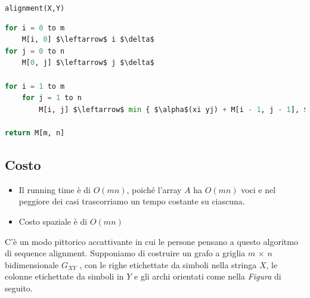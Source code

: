 \texttt{alignment(X,Y)}
\begin{lstlisting}[language=Python, mathescape=true]
for i = 0 to m
	M[i, 0] $\leftarrow$ i $\delta$
for j = 0 to n
	M[0, j] $\leftarrow$ j $\delta$
	
for i = 1 to m
	for j = 1 to n
		M[i, j] $\leftarrow$ min { $\alpha$(xi yj) + M[i - 1, j - 1], $\delta$ + M [i - 1, j], $\delta$ + M [i, j - 1] }
 		
return M[m, n]
\end{lstlisting}

\subsection{Costo}

\begin{itemize}
  \item
        Il running time è di $O(mn)$, poiché l'array $A$ ha $O(mn)$ voci
        e nel peggiore dei casi trascorriamo un tempo costante su ciascuna.
  \item
        Costo spaziale è di $O(mn)$
\end{itemize}

C'è un modo pittorico accattivante in cui le persone pensano a questo
algoritmo di sequence alignment. Supponiamo di costruire un grafo a
griglia $m$ × $n$ bidimensionale $G_{XY}$ , con le righe
etichettate da simboli nella stringa $X$, le colonne etichettate da
simboli in $Y$ e gli archi orientati come nella \emph{Figura} di
seguito.

